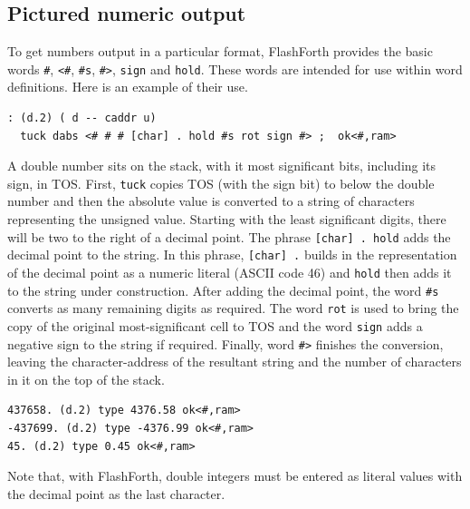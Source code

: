 \documentclass[12pt,a4paper]{article}
\begin{document}
\subsection{Pictured numeric output}
%
To get numbers output in a particular format, FlashForth provides
the basic words \verb!#!, \verb!<#!, \verb!#s!, \verb!#>!, \verb!sign! and \verb!hold!.
These words are intended for use within word definitions.
Here is an example of their use.
\begin{verbatim}
: (d.2) ( d -- caddr u) 
  tuck dabs <# # # [char] . hold #s rot sign #> ;  ok<#,ram>
\end{verbatim}
A double number sits on the stack, with it most significant bits, including its sign, in TOS.
First, \verb!tuck! copies TOS (with the sign bit) to below the double number and 
then the absolute value is converted to a string of characters representing the unsigned
value.
Starting with the least significant digits, there will be two to the right of a decimal point.
The phrase \verb![char] . hold! adds the decimal point to the string.
In this phrase, \verb![char] .! builds in the representation of the decimal point as a numeric literal
(ASCII code 46) and \verb!hold! then adds it to the string under construction.
After adding the decimal point, the word \verb!#s! converts as many remaining digits as required.
The word \verb!rot! is used to bring the copy of the original most-significant cell to TOS
and the word \verb!sign! adds a negative sign to the string if required.
Finally, word \verb!#>! finishes the conversion, leaving the character-address of the resultant string 
and the number of characters in it on the top of the stack.
\begin{verbatim}
437658. (d.2) type 4376.58 ok<#,ram>
-437699. (d.2) type -4376.99 ok<#,ram>
45. (d.2) type 0.45 ok<#,ram>
\end{verbatim}
Note that, with FlashForth, double integers must be entered as literal values with the decimal point 
as the last character.

\newpage
\end{document}
